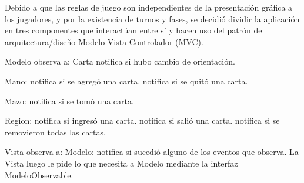 Debido a que las reglas de juego son independientes de la presentación gráfica a los jugadores, y por la existencia de turnos y fases, se decidió dividir la aplicación en tres componentes que interactúan entre sí y hacen uso del patrón de arquitectura/diseño Modelo-Vista-Controlador (MVC).


Modelo observa a:
Carta
notifica si hubo cambio de orientación.

Mano:
notifica si se agregó una carta.
notifica si se quitó una carta.

Mazo:
notifica si se tomó una carta.

Region:
notifica si ingresó una carta.
notifica si salió una carta.
notifica si se removieron todas las cartas.

Vista observa a:
Modelo:
notifica si sucedió alguno de los eventos que observa.
La Vista luego le pide lo que necesita a Modelo mediante la interfaz ModeloObservable.

